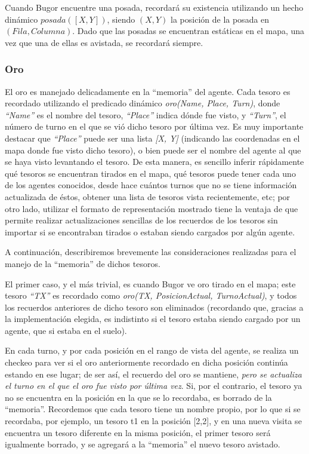 \documentclass[a4paper,10pt,spanish]{article}
\begin{document}
		Cuando Bugor encuentre una posada, recordar\'a su existencia utilizando un hecho din\'amico $posada([X, Y])$, siendo $(X, Y)$ la posici\'on de la posada en $(Fila,Columna)$. Dado que las posadas se encuentran est\'aticas en el mapa, una vez que una de ellas es avistada, se recordar\'a siempre.
		
		\subsubsection{Oro}
		
		El oro es manejado delicadamente en la ``memoria'' del agente. Cada tesoro es recordado utilizando el predicado din\'amico \emph{oro(Name, Place, Turn)}, donde \emph{``Name''} es el nombre del tesoro, \emph{``Place''} indica d\'onde fue visto, y \emph{``Turn''}, el n\'umero de turno en el que se vi\'o dicho tesoro por \'ultima vez. Es muy importante destacar que \emph{``Place''} puede ser una lista \emph{[X, Y]} (indicando las coordenadas en el mapa donde fue visto dicho tesoro), o bien puede ser el nombre del agente al que se haya visto levantando el tesoro. De esta manera, es sencillo inferir r\'apidamente qu\'e tesoros se encuentran tirados en el mapa, qu\'e tesoros puede tener cada uno de los agentes conocidos, desde hace cu\'antos turnos que no se tiene informaci\'on actualizada de \'estos, obtener una lista de tesoros vista recientemente, etc; por otro lado, utilizar el formato de representaci\'on mostrado tiene la ventaja de que permite realizar actualizaciones sencillas de los recuerdos de los tesoros sin importar si se encontraban tirados o estaban siendo cargados por alg\'un agente.
		
		A continuaci\'on, describiremos brevemente las consideraciones realizadas para el manejo de la ``memoria'' de dichos tesoros.
		
		El primer caso, y el m\'as trivial, es cuando Bugor ve oro tirado en el mapa; este tesoro \emph{``TX''} es recordado como \emph{oro(TX, PosicionActual, TurnoActual)}, y todos los recuerdos anteriores de dicho tesoro son eliminados (recordando que, gracias a la implementaci\'on elegida, es indistinto si el tesoro estaba siendo cargado por un agente, que si estaba en el suelo).
		
		En cada turno, y por cada posici\'on en el rango de vista del agente, se realiza un checkeo para ver si el oro anteriormente recordado en dicha posici\'on contin\'ua estando en ese lugar; de ser as\'i, el recuerdo del oro se mantiene, \emph{pero se actualiza el turno en el que el oro fue visto por \'ultima vez}. Si, por el contrario, el tesoro ya no se encuentra en la posici\'on en la que se lo recordaba, es borrado de la ``memoria''. Recordemos que cada tesoro tiene un nombre propio, por lo que si se recordaba, por ejemplo, un tesoro t1 en la posici\'on [2,2], y en una nueva visita se encuentra un tesoro diferente en la misma posici\'on, el primer tesoro ser\'a igualmente borrado, y se agregar\'a a la ``memoria'' el nuevo tesoro avistado.
		
\end{document}
